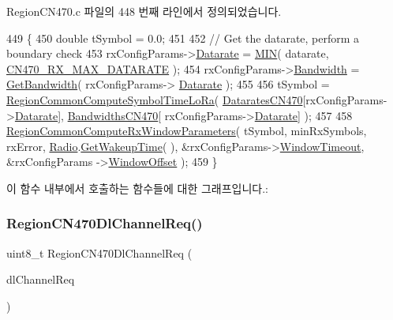 Region\+C\+N470.\+c 파일의 448 번째 라인에서 정의되었습니다.


\begin{DoxyCode}
449 \{
450     \textcolor{keywordtype}{double} tSymbol = 0.0;
451 
452     \textcolor{comment}{// Get the datarate, perform a boundary check}
453     rxConfigParams->\mbox{\hyperlink{structs_rx_config_params_ae2f6080f3aa0e9485c55513ca56bb24d}{Datarate}} = \mbox{\hyperlink{utilities_8h_a3acffbd305ee72dcd4593c0d8af64a4f}{MIN}}( datarate, \mbox{\hyperlink{group___r_e_g_i_o_n_c_n470_ga32c6368247a51d46cc53dfe9ea8c1d39}{CN470\_RX\_MAX\_DATARATE}} );
454     rxConfigParams->\mbox{\hyperlink{structs_rx_config_params_aa8fc32e4883d30642e0ceb5845006a57}{Bandwidth}} = \mbox{\hyperlink{_region_c_n470_8c_afbe81e6d36760141722791d216d4ac60}{GetBandwidth}}( rxConfigParams->
      \mbox{\hyperlink{structs_rx_config_params_ae2f6080f3aa0e9485c55513ca56bb24d}{Datarate}} );
455 
456     tSymbol = \mbox{\hyperlink{group___r_e_g_i_o_n_c_o_m_m_o_n_ga79ed8b6555b68276d3c9ff2626b20fc8}{RegionCommonComputeSymbolTimeLoRa}}( 
      \mbox{\hyperlink{group___r_e_g_i_o_n_c_n470_gad0ff6edccf59c2eaf0e6f35a46d62a05}{DataratesCN470}}[rxConfigParams->\mbox{\hyperlink{structs_rx_config_params_ae2f6080f3aa0e9485c55513ca56bb24d}{Datarate}}], \mbox{\hyperlink{group___r_e_g_i_o_n_c_n470_gae2b304c90af11277c46253a9fc934b98}{BandwidthsCN470}}[
      rxConfigParams->\mbox{\hyperlink{structs_rx_config_params_ae2f6080f3aa0e9485c55513ca56bb24d}{Datarate}}] );
457 
458     \mbox{\hyperlink{group___r_e_g_i_o_n_c_o_m_m_o_n_gaba7114d0ca01f04933710feb13646138}{RegionCommonComputeRxWindowParameters}}( tSymbol, minRxSymbols, 
      rxError, \mbox{\hyperlink{sx1276mb1las_8c_acf9fe61a72c16fa29a0dc449d23e3820}{Radio}}.\mbox{\hyperlink{struct_radio__s_aa6c05429af1a9f479d4720d95d0ee774}{GetWakeupTime}}( ), &rxConfigParams->\mbox{\hyperlink{structs_rx_config_params_a9d9f6c16ea62e2bcc09b100e2cb83e3f}{WindowTimeout}}, &rxConfigParams
      ->\mbox{\hyperlink{structs_rx_config_params_a9d092276960345e3b06ba105cf0c8b98}{WindowOffset}} );
459 \}
\end{DoxyCode}
이 함수 내부에서 호출하는 함수들에 대한 그래프입니다.\+:
\mbox{\label{group___r_e_g_i_o_n_c_n470_ga2fb7a7dcde7482f3a0da9028090c9c7f}} 
\subsubsection{\texorpdfstring{Region\+C\+N470\+Dl\+Channel\+Req()}{RegionCN470DlChannelReq()}}
{\footnotesize\ttfamily uint8\+\_\+t Region\+C\+N470\+Dl\+Channel\+Req (\begin{DoxyParamCaption}\item[{\mbox{\hyperlink{group___r_e_g_i_o_n_gae0d608ff1f8ea0a430e4f9a4c38ec7f3}{Dl\+Channel\+Req\+Params\+\_\+t}} $\ast$}]{dl\+Channel\+Req }\end{DoxyParamCaption})}



